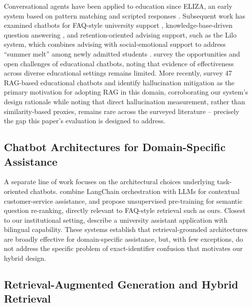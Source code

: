 \documentclass[a4paper,twoside]{article}
\begin{document}
Conversational agents have been applied to education since ELIZA, an early system based on pattern matching and scripted responses \citep{adamopoulou2021}. Subsequent work has examined chatbots for FAQ-style university support \citep{elashmawi2023}, knowledge-base-driven question answering \citep{formica2023}, and retention-oriented advising support, such as the Lilo system, which combines advising with social-emotional support to address ``summer melt'' among newly admitted students \citep{nguyen2023lilo}. \citet{hwang2021} survey the opportunities and open challenges of educational chatbots, noting that evidence of effectiveness across diverse educational settings remains limited. More recently, \citet{swacha2025} survey 47 RAG-based educational chatbots and identify hallucination mitigation as the primary motivation for adopting RAG in this domain, corroborating our system's design rationale while noting that direct hallucination measurement, rather than similarity-based proxies, remains rare across the surveyed literature -- precisely the gap this paper's evaluation is designed to address.

\subsection{Chatbot Architectures for Domain-Specific Assistance}

A separate line of work focuses on the architectural choices underlying task-oriented chatbots. \citet{pandya2023} combine LangChain orchestration with LLMs for contextual customer-service assistance, and \citet{campese2024} propose unsupervised pre-training for semantic question re-ranking, directly relevant to FAQ-style retrieval such as ours. Closest to our institutional setting, \citet{sweidan2021} describe a university assistant application with bilingual capability. These systems establish that retrieval-grounded architectures are broadly effective for domain-specific assistance, but, with few exceptions, do not address the specific problem of exact-identifier confusion that motivates our hybrid design.

\subsection{Retrieval-Augmented Generation and Hybrid Retrieval}
\end{document}
